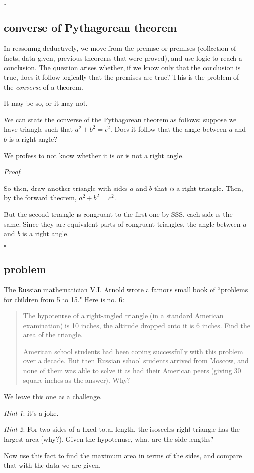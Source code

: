 \documentclass[11pt, oneside]{article}
\begin{document}
$\square$

\subsection*{converse of Pythagorean theorem}

In reasoning deductively, we move from the premise or premises (collection of facts, data given, previous theorems that were proved), and use logic to reach a conclusion.  The question arises whether, if we know only that the conclusion is true, does it follow logically that the premises are true?  This is the problem of the \emph{converse} of a theorem.

It may be so, or it may not.

We can state the converse of the Pythagorean theorem as follows:  suppose we have triangle such that $a^2 + b^2 = c^2$.  Does it follow that the angle between $a$ and $b$ is a right angle?

We profess to not know whether it is or is not a right angle.

\emph{Proof}.

So then, draw another triangle with sides $a$ and $b$ that \emph{is} a right triangle.  Then, by the forward theorem, $a^2 + b^2 = c^2$.  

But the second triangle is congruent to the first one by SSS, each side is the same.  Since they are equivalent parts of congruent triangles, the angle between $a$ and $b$ is a right angle. 

$\square$

\subsection*{problem}

The Russian mathematician V.I. Arnold wrote a famous small book of ``problems for children from 5 to 15."  Here is no. 6:

\begin{quote}
The hypotenuse of a right-angled triangle (in a standard American examination) is 10 inches, the altitude dropped onto it is 6 inches. Find the area of the triangle.

American school students had been coping successfully with this problem over a decade. But then Russian school students arrived from Moscow, and none of them was able to solve it as had their American peers (giving 30 square inches as the answer). Why?
\end{quote}

We leave this one as a challenge.  

\emph{Hint 1}:  it's a joke.

\emph{Hint 2}:  For two sides of a fixed total length, the isosceles right triangle has the largest area (why?).  Given the hypotenuse, what are the side lengths?

Now use this fact to find the maximum area in terms of the sides, and compare that with the data we are given.
  
\end{document}
